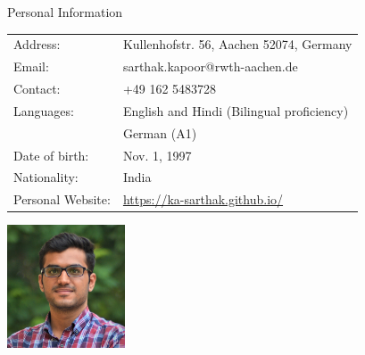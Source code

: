 \documentclass{resume}
\begin{document}
  

  \begin{rSection}{Personal Information}\itemsep -3pt
    \begin{multicols}{2}
    \begin{tabular}{|ll}
      Address: & Kullenhofstr. 56, Aachen 52074, Germany \\
      Email: & sarthak.kapoor@rwth-aachen.de \\
      Contact: & +49 162 5483728 \\
      Languages: &  English and Hindi (Bilingual proficiency)\\
      & German (A1) \\
      Date of birth: &  Nov. 1, 1997 \\ 
      Nationality: &  India \\
      Personal Website: & \url{https://ka-sarthak.github.io/}\\
    \end{tabular}
    \columnbreak
    \hfill \includegraphics[width=3.5cm]{profile.jpg}
    \end{multicols}
  \end{rSection}

\end{document}
